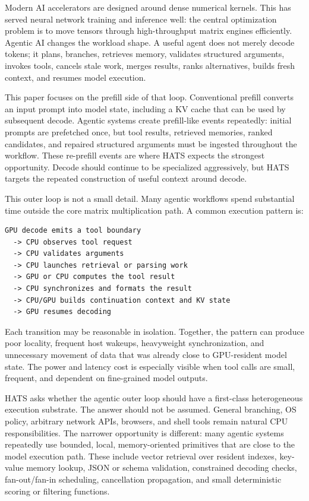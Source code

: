 \documentclass[11pt]{article}
\begin{document}
Modern AI accelerators are designed around dense numerical kernels. This has
served neural network training and inference well: the central optimization
problem is to move tensors through high-throughput matrix engines efficiently.
Agentic AI changes the workload shape. A useful agent does not merely decode
tokens; it plans, branches, retrieves memory, validates structured arguments,
invokes tools, cancels stale work, merges results, ranks alternatives, builds
fresh context, and resumes model execution.

This paper focuses on the prefill side of that loop. Conventional prefill
converts an input prompt into model state, including a KV cache that can be used
by subsequent decode. Agentic systems create prefill-like events repeatedly:
initial prompts are prefetched once, but tool results, retrieved memories,
ranked candidates, and repaired structured arguments must be ingested throughout
the workflow. These re-prefill events are where HATS expects the strongest
opportunity. Decode should continue to be specialized aggressively, but HATS
targets the repeated construction of useful context around decode.

This outer loop is not a small detail. Many agentic workflows spend substantial
time outside the core matrix multiplication path. A common execution pattern is:

\begin{lstlisting}
GPU decode emits a tool boundary
  -> CPU observes tool request
  -> CPU validates arguments
  -> CPU launches retrieval or parsing work
  -> GPU or CPU computes the tool result
  -> CPU synchronizes and formats the result
  -> CPU/GPU builds continuation context and KV state
  -> GPU resumes decoding
\end{lstlisting}

Each transition may be reasonable in isolation. Together, the pattern can
produce poor locality, frequent host wakeups, heavyweight synchronization, and
unnecessary movement of data that was already close to GPU-resident model state.
The power and latency cost is especially visible when tool calls are small,
frequent, and dependent on fine-grained model outputs.

HATS asks whether the agentic outer loop should have a first-class
heterogeneous execution substrate. The answer should not be assumed. General
branching, OS policy, arbitrary network APIs, browsers, and shell tools remain
natural CPU responsibilities. The narrower opportunity is different: many
agentic systems repeatedly use bounded, local, memory-oriented primitives that
are close to the model execution path. These include vector retrieval over
resident indexes, key-value memory lookup, JSON or schema validation, constrained
decoding checks, fan-out/fan-in scheduling, cancellation propagation, and small
deterministic scoring or filtering functions.
\end{document}
